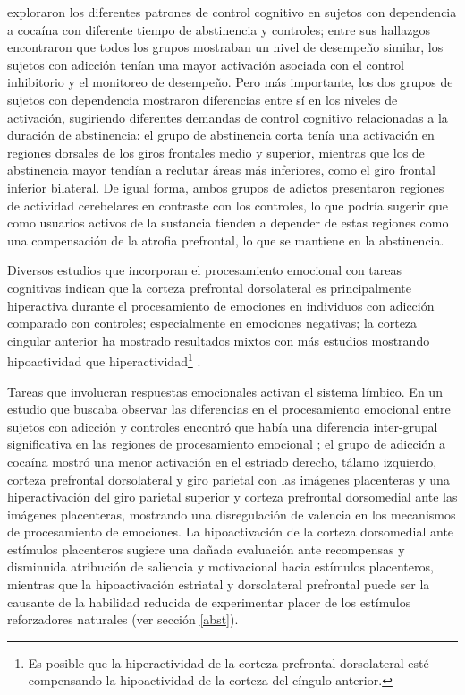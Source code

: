 \textcite{Connolly2012} exploraron los diferentes patrones de control cognitivo en sujetos con dependencia a cocaína con diferente tiempo de abstinencia y controles;
entre sus hallazgos encontraron que todos los grupos mostraban un nivel de desempeño similar, los sujetos con adicción tenían una mayor activación asociada con el control inhibitorio y el monitoreo de desempeño. Pero más importante, los dos grupos de sujetos con dependencia mostraron diferencias entre sí en los niveles de activación, sugiriendo diferentes demandas de control cognitivo relacionadas a la duración de abstinencia: el grupo de abstinencia corta tenía una activación en regiones dorsales de los giros frontales medio y superior, mientras que los de abstinencia mayor tendían a reclutar áreas más inferiores, como el giro frontal inferior bilateral.
De igual forma, ambos grupos de adictos presentaron regiones de actividad cerebelares en contraste con los controles, lo que podría sugerir que como usuarios activos de la sustancia tienden a depender de estas regiones como una compensación de la atrofia prefrontal, lo que se mantiene en la abstinencia. \par
Diversos estudios que incorporan el procesamiento emocional con tareas cognitivas indican que la corteza prefrontal dorsolateral es principalmente hiperactiva durante el procesamiento de emociones en individuos con adicción comparado con controles; especialmente en emociones negativas; la corteza cingular anterior ha mostrado resultados mixtos \textemdash{}con más estudios mostrando hipoactividad que hiperactividad\footnote{Es posible que la hiperactividad de la corteza prefrontal dorsolateral esté compensando la hipoactividad de la corteza del cíngulo anterior.} \parencite{Goldstein2012a}.\par
Tareas que involucran respuestas emocionales activan el sistema límbico. En un estudio que buscaba observar las diferencias en el procesamiento emocional entre sujetos con adicción y controles encontró que había una diferencia inter-grupal significativa en las regiones de procesamiento emocional \parencite{Asensio2010}; el grupo de adicción a cocaína mostró una menor activación en el estriado derecho, tálamo izquierdo, corteza prefrontal dorsolateral y giro parietal con las imágenes placenteras y una hiperactivación del giro parietal superior y corteza prefrontal dorsomedial ante las imágenes placenteras, mostrando una disregulación de valencia en los mecanismos de procesamiento de emociones.
La hipoactivación de la corteza dorsomedial ante estímulos placenteros sugiere una dañada evaluación ante recompensas y disminuida atribución de saliencia y motivacional hacia estímulos placenteros, mientras que la hipoactivación estriatal y dorsolateral prefrontal puede ser la causante de la habilidad reducida de experimentar placer de los estímulos reforzadores naturales (ver sección \ref{abst}).

